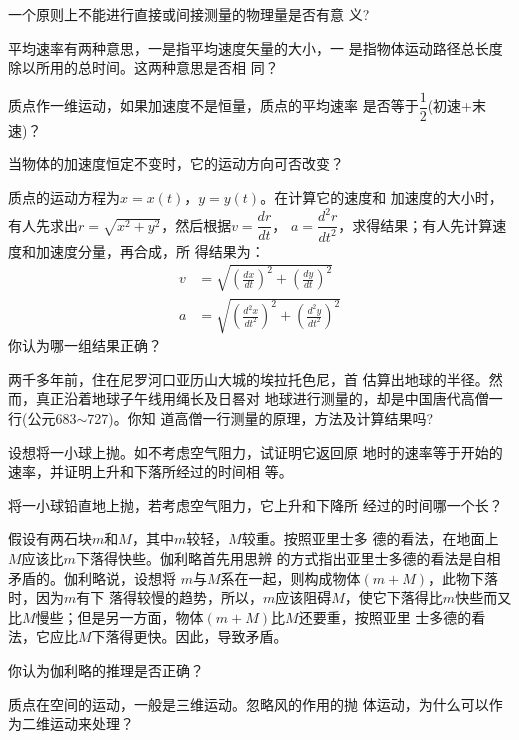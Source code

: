 \questions
\fangsong
\question 一个原则上不能进行直接或间接测量的物理量是否有意
义?

\question 平均速率有两种意思，一是指平均速度矢量的大小，一
是指物体运动路径总长度除以所用的总时间。这两种意思是否相
同？

\question 质点作一维运动，如果加速度不是恒量，质点的平均速率
是否等于$\dfrac 1 2$(初速+末速)？

\question 当物体的加速度恒定不变时，它的运动方向可否改变？

\question 质点的运动方程为$x=x(t)$，$y=y(t)$。在计算它的速度和
加速度的大小时，有人先求出$r=\sqrt{x^2+y^2}$，然后根据$v=\dfrac{dr}{dt}$，
$a=\dfrac{d^2r}{dt^2}$，求得结果；有人先计算速度和加速度分量，再合成，所
得结果为：
\begin{equation*}
    \begin{aligned}
        v &=\sqrt{\left(\frac{d x}{d t}\right)^{2}+\left(\frac{d y}{d t}\right)^{2}} \\
        a &=\sqrt{\left(\frac{d^{2} x}{d t^{2}}\right)^{2}+\left(\frac{d^{2} y}{d t^{2}}\right)^{2}}
    \end{aligned}
\end{equation*}
你认为哪一组结果正确？

\question  两千多年前，住在尼罗河口亚历山大城的埃拉托色尼，首
估算出地球的半径。然而，真正沿着地球子午线用绳长及日晷对
地球进行测量的，却是中国唐代高僧一行(公元683$\sim$727)。你知
道高僧一行测量的原理，方法及计算结果吗?

\question  设想将一小球上抛。如不考虑空气阻力，试证明它返回原
地时的速率等于开始的速率，并证明上升和下落所经过的时间相
等。

\question  将一小球铅直地上抛，若考虑空气阻力，它上升和下降所
经过的时间哪一个长？

\question  假设有两石块$m$和$M$，其中$m$较轻，$M$较重。按照亚里士多
德的看法，在地面上$M$应该比$m$下落得快些。伽利略首先用思辨
的方式指出亚里士多德的看法是自相矛盾的。伽利略说，设想将
$m$与$M$系在一起，则构成物体$(m+M)$，此物下落时，因为$m$有下
落得较慢的趋势，所以，$m$应该阻碍$M$，使它下落得比$m$快些而又
比$M$慢些；但是另一方面，物体$(m+M)$比$M$还要重，按照亚里
士多德的看法，它应比$M$下落得更快。因此，导致矛盾。

你认为伽利略的推理是否正确？

\question  质点在空间的运动，一般是三维运动。忽略风的作用的抛
体运动，为什么可以作为二维运动来处理？
\normalfont
